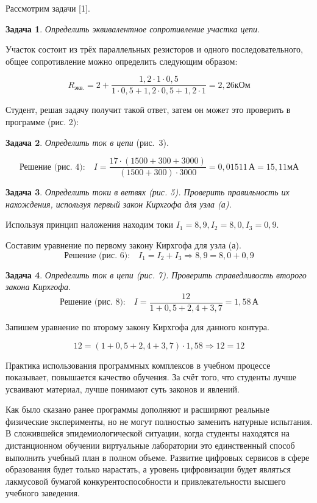 Рассмотрим задачи [1].

\textbf{Задача 1}. \textit{Определить эквивалентное сопротивление участка цепи.}

Участок состоит из трёх параллельных резисторов и одного последовательного, общее сопротивление можно определить следующим образом:

$$R_{\text{экв.}}=2+\frac{1,2\cdot1\cdot0,5}{1\cdot0,5+1,2\cdot0,5+1,2\cdot1}=2,26\text{кОм}$$

Студент, решая задачу получит такой ответ, затем он может это проверить в программе (рис. 2):





\textbf{Задача 2}. \textit{Определить ток в цепи} (рис.~3).

$$\text{Решение (рис.~4):}\quad I=\frac{17\cdot(1500+300+3000)}{(1500+300)\cdot3000}=0,01511\,\text{А}=15,11\text{мА}$$

\vspace{-16pt}


\textbf{Задача 3}. \textit{Определить токи в ветвях (рис. 5). Проверить правильность их нахождения, используя первый закон Кирхгофа для узла (а).}

Используя принцип наложения находим токи $I_1=8,9, I_2=8,0, I_3=0,9$.

Составим уравнение по первому закону Кирхгофа для узла (а).
\vspace{-6pt}
$$\text{Решение (рис. 6):}\quad I_1=I_2+I_3\Rightarrow8,9=8,0+0,9$$
\vspace{-8pt}

\clearpage

\textbf{Задача 4}. \textit{Определить ток в цепи (рис. 7). Проверить справедливость второго закона Кирхгофа.}
\vspace{-2pt}
$$\text{Решение (рис.~8):}\quad I=\frac{12}{1+0,5+2,4+3,7}=1,58\,\text{А}$$

Запишем уравнение по второму закону Кирхгофа для данного контура.

$$12=(1+0,5+2,4+3,7)\cdot1,58\Rightarrow12=12$$



Практика использования программных комплексов в учебном процессе показывает, повышается качество обучения. За счёт того, что студенты лучше усваивают материал, лучше понимают суть законов и явлений.

Как было сказано ранее программы дополняют и расширяют реальные физические эксперименты, но не могут полностью заменить натурные испытания. В сложившейся эпидемиологической ситуации, когда студенты
находятся на дистанционном обучении виртуальные лаборатории это
единственный способ выполнить учебный план в полном объеме. Развитие
цифровых сервисов в сфере образования будет только нарастать, а уровень
цифровизации будет являться лакмусовой бумагой конкурентоспособности и
привлекательности высшего учебного заведения.

